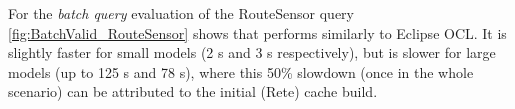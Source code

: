 For the \emph{batch query} evaluation of the \textsf{RouteSensor} query
\autoref{fig:BatchValid_RouteSensor} shows that \incquery{} performs similarly
to Eclipse OCL. It is slightly faster for small models (2 s and 3 s
respectively), but is slower for large models (up to 125 s and 78 s), where
this 50\% slowdown (once in the whole scenario) can be attributed to the
initial (Rete) cache build.


% 
% 

